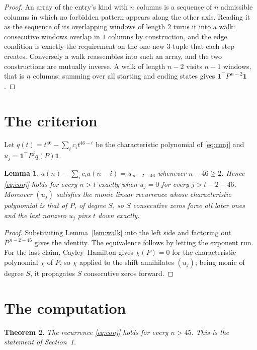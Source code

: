 \documentclass[11pt,a4paper]{article}
\theoremstyle{plain}
\newtheorem{theorem}{Theorem}
\newtheorem{lemma}[theorem]{Lemma}
\theoremstyle{definition}
\begin{document}
\begin{proof}
An array of the entry's kind with $n$ columns is a sequence of $n$ admissible columns in
which no forbidden pattern appears along the other axis. Reading it as the sequence of its
overlapping windows of length $2$ turns it into a walk: consecutive windows overlap in
$1$ columns by construction, and the edge condition is exactly the requirement on the one
new $3$-tuple that each step creates. Conversely a walk reassembles into such an array,
and the two constructions are mutually inverse. A walk of length $n-2$ visits $n-1$
windows, that is $n$ columns; summing over all starting and ending states gives
$\mathbf{1}^{\!\top}P^{\,n-2}\mathbf{1}$.
\end{proof}

\section{The criterion}

Let $q(t)=t^{46}-\sum_i c_i t^{46-i}$ be the characteristic polynomial of
\eqref{eq:conj} and $u_j=\mathbf{1}^{\!\top}P^{j}q(P)\mathbf{1}$.

\begin{lemma}\label{lem:crit}
$a(n)-\sum_i c_i a(n-i)=u_{\,n-2-46}$ whenever $n-46\ge2$. Hence
\eqref{eq:conj} holds for every $n>t$ exactly when $u_j=0$ for every
$j>t-2-46$. Moreover $(u_j)$ satisfies the monic linear recurrence whose
characteristic polynomial is that of $P$, of degree $S$, so $S$ consecutive zeros force all
later ones and the last nonzero $u_j$ pins $t$ down exactly.
\end{lemma}

\begin{proof}
Substituting Lemma~\ref{lem:walk} into the left side and factoring out
$P^{\,n-2-46}$ gives the identity. The equivalence follows by letting the exponent
run. For the last claim, Cayley--Hamilton gives $\chi(P)=0$ for the characteristic
polynomial $\chi$ of $P$, so $\chi$ applied to the shift annihilates $(u_j)$; being monic of
degree $S$, it propagates $S$ consecutive zeros forward.
\end{proof}

\section{The computation}

\begin{theorem}
The recurrence \eqref{eq:conj} holds for every $n>45$. This is the statement of
Section~1.
\end{theorem}
\end{document}
